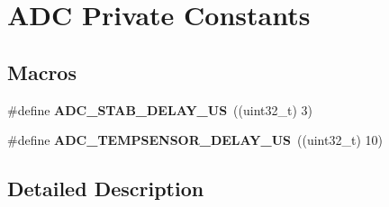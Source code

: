 \hypertarget{group___a_d_c___private___constants}{}\section{A\+DC Private Constants}
\label{group___a_d_c___private___constants}
\subsection*{Macros}
\begin{DoxyCompactItemize}
\item 
\#define {\bfseries A\+D\+C\+\_\+\+S\+T\+A\+B\+\_\+\+D\+E\+L\+A\+Y\+\_\+\+US}~((uint32\+\_\+t) 3)\hypertarget{group___a_d_c___private___constants_gad0d1562099d9e378dd1d33b3519cd0c2}{}\label{group___a_d_c___private___constants_gad0d1562099d9e378dd1d33b3519cd0c2}

\item 
\#define {\bfseries A\+D\+C\+\_\+\+T\+E\+M\+P\+S\+E\+N\+S\+O\+R\+\_\+\+D\+E\+L\+A\+Y\+\_\+\+US}~((uint32\+\_\+t) 10)\hypertarget{group___a_d_c___private___constants_gab57114ba262a4b64193617b22da005b0}{}\label{group___a_d_c___private___constants_gab57114ba262a4b64193617b22da005b0}

\end{DoxyCompactItemize}


\subsection{Detailed Description}

